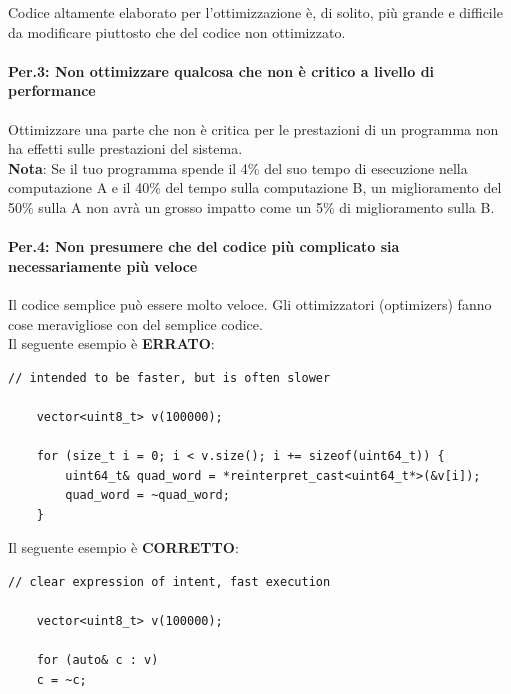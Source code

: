 \label{Per_2}

\textsf{\small Codice altamente elaborato per l'ottimizzazione è, di solito, più grande e difficile da modificare piuttosto che del codice non ottimizzato.} \\


\paragraph{Per.3: Non ottimizzare qualcosa che non è critico a livello di performance}

\textsf{\small Ottimizzare una parte che non è critica per le prestazioni di un programma non ha effetti sulle prestazioni del sistema. } \\

\textsf{\small \textbf{Nota}: Se il tuo programma spende il 4\% del suo tempo di esecuzione nella computazione A e il 40\% del tempo sulla computazione B, un miglioramento del 50\% sulla A non avrà un grosso impatto come un 5\% di miglioramento sulla B. } \\

\paragraph{Per.4: Non presumere che del codice più complicato sia necessariamente più veloce}

\textsf{\small Il codice semplice può essere molto veloce. Gli ottimizzatori (optimizers) fanno cose meravigliose con del semplice codice. } \\

\textsf{\small Il seguente esempio è \textbf{\color{red}ERRATO}\normalcolor:}

\begin{lstlisting}[frame=single, rulecolor=\color{red}]
	// intended to be faster, but is often slower
	
	vector<uint8_t> v(100000);
	
	for (size_t i = 0; i < v.size(); i += sizeof(uint64_t)) {
		uint64_t& quad_word = *reinterpret_cast<uint64_t*>(&v[i]);
		quad_word = ~quad_word;
	}
\end{lstlisting}

\textsf{\small Il seguente esempio è \textbf{\color{ForestGreen}CORRETTO}\normalcolor:}

\begin{lstlisting}[frame=single, rulecolor=\color{ForestGreen}]
	// clear expression of intent, fast execution
	
	vector<uint8_t> v(100000);
	
	for (auto& c : v)
	c = ~c;
\end{lstlisting}

